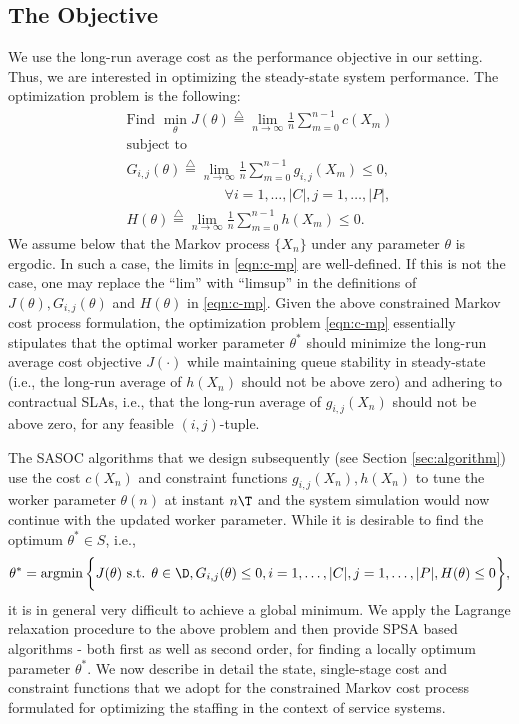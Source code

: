 \documentclass[11pt,letterpaper,english]{article}
\begin{document}
\subsection{The Objective}
\label{sect:obj}
We use the long-run average cost as the performance objective in our setting. Thus, we are interested in optimizing the steady-state system performance. The optimization problem is the following:
\begin{equation}
\label{eqn:c-mp}
\begin{array}{l}
\textrm{Find } \min\limits_{\theta} J(\theta) \stackrel{\triangle}{=} \lim\limits_{n \rightarrow \infty}\frac{1}{n} \sum\limits_{m=0}^{n-1} c(X_m)\\
\textrm{subject to}\\
G_{i,j}(\theta) \stackrel{\triangle}{=} \lim\limits_{n \rightarrow \infty}\frac{1}{n} \sum\limits_{m=0}^{n-1} g_{i,j}(X_m) \le 0, \\\qquad\qquad\qquad\quad\forall i=1,\ldots,|C|, j=1,\ldots,|P|,\\
H(\theta) \stackrel{\triangle}{=} \lim\limits_{n \rightarrow \infty}\frac{1}{n} \sum\limits_{m=0}^{n-1} h(X_m) \le 0.
\end{array}
\end{equation}
We assume below that the Markov process $\{X_n\}$ under any parameter $\theta$
is ergodic. In such a case, the limits in \eqref{eqn:c-mp} are well-defined. If
this is not the case, one may replace the ``lim'' with ``limsup'' in the
definitions of $J(\theta), G_{i,j}(\theta)$ and $H(\theta)$ in
\eqref{eqn:c-mp}. 
Given the above constrained Markov cost process formulation, the optimization problem \eqref{eqn:c-mp} essentially stipulates that the optimal worker parameter $\theta^*$ should minimize the long-run average cost objective $J(\cdot)$ while maintaining queue stability in steady-state  (i.e., the long-run average of  $h(X_n)$ should not be above zero) and adhering to contractual SLAs, i.e., that the long-run average of $g_{i,j}(X_n)$ should not be above zero, for any feasible $(i,j)$-tuple.

The SASOC algorithms that we design subsequently (see Section
\ref{sec:algorithm}) use the cost $c(X_n)$ and constraint functions
$g_{i,j}(X_n), h(X_n)$ to tune the worker parameter $\theta(n)$ at instant $n\T$
and the system simulation would now continue with the updated worker parameter. 
While it is desirable to find the optimum  $\theta^* \in S$, i.e.,
\begin{align*}
\label{eq:optimal-parameter-set}
\theta^* = \mathop{{\rm argmin}} \bigg\{ J(\theta) \text{ s.t. } \theta \in \D, G_{i,j}(\theta) \le 0, i=1,\ldots,|C|,j=1,\ldots,|P|,H(\theta) \le 0\bigg\},
\end{align*}
it is in general very difficult to achieve a global minimum. We apply the Lagrange relaxation procedure to the above problem and then provide SPSA based algorithms - both first as well as second order, for finding a locally optimum parameter $\theta^*$.
We now describe in detail the state, single-stage cost and constraint functions that we adopt for the constrained Markov cost process formulated for optimizing the staffing in the context of service systems.
\end{document}
